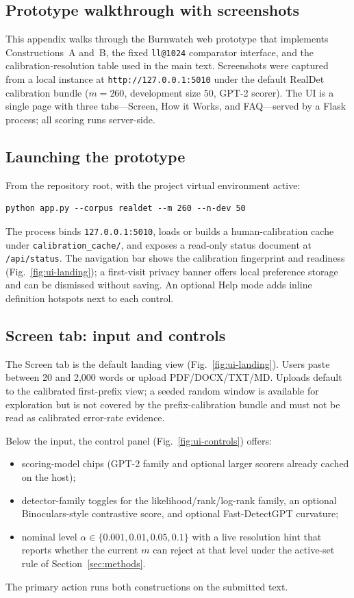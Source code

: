 \documentclass[pdflatex,sn-mathphys-num]{sn-jnl}
\begin{document}
\begin{appendices}
\section{Prototype walkthrough with screenshots}\label{app:ui}

This appendix walks through the Burnwatch web prototype that implements Constructions~A and~B, the fixed \texttt{ll@1024} comparator interface, and the calibration-resolution table used in the main text. Screenshots were captured from a local instance at \texttt{http://127.0.0.1:5010} under the default RealDet calibration bundle (\(m=260\), development size \(50\), GPT-2 scorer). The UI is a single page with three tabs---Screen, How it Works, and FAQ---served by a Flask process; all scoring runs server-side.

\subsection{Launching the prototype}

From the repository root, with the project virtual environment active:
\begin{verbatim}
python app.py --corpus realdet --m 260 --n-dev 50
\end{verbatim}
The process binds \texttt{127.0.0.1:5010}, loads or builds a human-calibration cache under \texttt{calibration\_cache/}, and exposes a read-only status document at \texttt{/api/status}. The navigation bar shows the calibration fingerprint and readiness (Fig.~\ref{fig:ui-landing}); a first-visit privacy banner offers local preference storage and can be dismissed without saving. An optional Help mode adds inline definition hotspots next to each control.

\subsection{Screen tab: input and controls}

The Screen tab is the default landing view (Fig.~\ref{fig:ui-landing}). Users paste between 20 and 2{,}000 words or upload PDF/DOCX/TXT/MD. Uploads default to the calibrated first-prefix view; a seeded random window is available for exploration but is not covered by the prefix-calibration bundle and must not be read as calibrated error-rate evidence.

Below the input, the control panel (Fig.~\ref{fig:ui-controls}) offers:
\begin{itemize}
\item scoring-model chips (GPT-2 family and optional larger scorers already cached on the host);
\item detector-family toggles for the likelihood/rank/log-rank family, an optional Binoculars-style contrastive score, and optional Fast-DetectGPT curvature;
\item nominal level \(\alpha\in\{0.001,0.01,0.05,0.1\}\) with a live resolution hint that reports whether the current \(m\) can reject at that level under the active-set rule of Section~\ref{sec:methods}.
\end{itemize}
The primary action runs both constructions on the submitted text.


\end{appendices}
\end{document}
